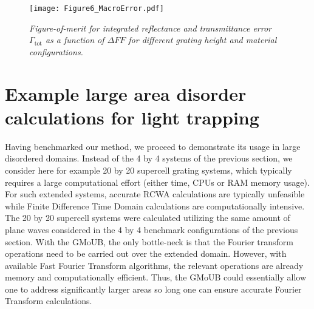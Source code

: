 \documentclass[ floatfix,reprint,amsmath,amssymb,aps,prb]{revtex4-1}
\begin{document}
\begin{figure}[h]

	\texttt{[image: Figure6\_MacroError.pdf]}
	\caption{\textit{ Figure-of-merit for integrated reflectance and transmittance error $\Gamma_\mathrm{tot}$ as a function of $\Delta FF$ for different grating height and material configurations. }}\label{fig6}

\end{figure}
\section{Example large area disorder calculations for light trapping} 

Having benchmarked our method, we proceed to demonstrate its usage in large disordered domains. Instead of the 4 by 4 systems of the previous section, we consider here for example 20 by 20 supercell grating systems, which typically requires a large computational effort (either time, CPUs or RAM memory usage). For such extended systems, accurate RCWA calculations are typically unfeasible while Finite Difference Time Domain calculations are computationally intensive. The 20 by 20 supercell systems were calculated utilizing the same amount of plane waves considered in the 4 by 4 benchmark configurations of the previous section. With the GMoUB, the only bottle-neck is that the Fourier transform operations need to be carried out over the extended domain. However, with available Fast Fourier Transform algorithms, the relevant operations are already memory and computationally efficient. Thus, the GMoUB could essentially allow one to address significantly larger areas so long one can ensure accurate Fourier Transform calculations. 
\end{document}
